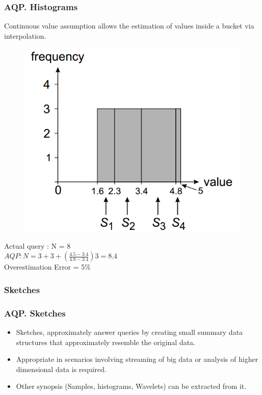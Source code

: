 \documentclass{beamer}
\begin{document}
\begin{frame}
\frametitle{AQP. Histograms}
Continuous value assumption allows the estimation of values inside a bucket via interpolation.
\begin{figure}
  \centering
  \includegraphics[scale=0.30]{img/Blinktopus-EquiDepth.png}
\end{figure}
Actual query : N = 8\\
$ AQP: N = 3 + 3 + (\frac{4.5-3.4}{4.8-3.4})3 = 8.4$\\
Overestimation Error = 5\%
\end{frame}

\subsubsection{Sketches}
\begin{frame}
\frametitle{AQP. Sketches}
\begin{itemize}
		\item{Sketches, approximately answer queries by creating small summary data structures that approximately resemble the original data.}
		\item{Appropriate in scenarios involving streaming of big data or analysis of higher dimensional data is required.}
		\item{Other synopsis (Samples, histograms, Wavelets) can be extracted from it.}
\end{itemize}

\end{frame}
\end{document}
